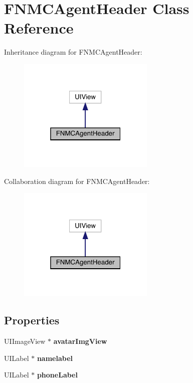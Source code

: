 \hypertarget{interface_f_n_m_c_agent_header}{}\section{F\+N\+M\+C\+Agent\+Header Class Reference}
\label{interface_f_n_m_c_agent_header}


Inheritance diagram for F\+N\+M\+C\+Agent\+Header\+:\nopagebreak
\begin{figure}[H]
\begin{center}
\leavevmode
\includegraphics[width=184pt]{interface_f_n_m_c_agent_header__inherit__graph}
\end{center}
\end{figure}


Collaboration diagram for F\+N\+M\+C\+Agent\+Header\+:\nopagebreak
\begin{figure}[H]
\begin{center}
\leavevmode
\includegraphics[width=184pt]{interface_f_n_m_c_agent_header__coll__graph}
\end{center}
\end{figure}
\subsection*{Properties}
\begin{DoxyCompactItemize}
\item 
\mbox{\label{interface_f_n_m_c_agent_header_a12cd76140264b03dc9e1abef1ee58e8a}} 
U\+I\+Image\+View $\ast$ {\bfseries avatar\+Img\+View}
\item 
\mbox{\label{interface_f_n_m_c_agent_header_ae7fc6c974e2068b78fed9ed67c54ab54}} 
U\+I\+Label $\ast$ {\bfseries namelabel}
\item 
\mbox{\label{interface_f_n_m_c_agent_header_a0429197f7e0142f2b6f0539cc0153b4f}} 
U\+I\+Label $\ast$ {\bfseries phone\+Label}
\end{DoxyCompactItemize}



